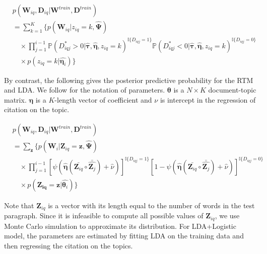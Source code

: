 \begin{equation}
\begin{split}
  &p(\mathbf{W}_{iq}, \mathbf{D}_{iq} \vert \mathbf{W}^{train}, \mathbf{D}^{train}) \\
  &= \sum_{k=1}^K \Big\{ p(\mathbf{W}_{iq} \vert z_{iq} = k, \hat{\boldsymbol \Psi})\\
  &\quad \times \prod_{j=1}^{i-1} \mathbb{P}(D_{iqj}^* > 0 \vert \hat{\boldsymbol \tau}, \hat{\boldsymbol \eta}, z_{iq} = k)^{\mathbb{I}\{D_{iqj}=1\}}\mathbb{P}(D_{iqj}^* < 0 \vert \hat{\boldsymbol \tau}, \hat{\boldsymbol \eta}, z_{iq} = k)^{\mathbb{I}\{D_{iqj}=0\}} \\
  &\quad \times p(z_{iq} = k \vert \hat{\boldsymbol \eta_i}) \Big\}
\end{split}
\end{equation}

By contrast, the following gives the posterior predictive probability for the RTM and LDA. 
We follow \cite{chang2009relational} for the notation of parameters.
$\boldsymbol\theta$ is a $N \times K$ document-topic matrix.
$\boldsymbol\eta$ is a $K$-length vector of coefficient and $\nu$ is intercept in the regression of citation on the topic.

\begin{equation}
\begin{split}
  &p(\mathbf{W}_{iq}, \mathbf{D}_{iq} \vert \mathbf{W}^{train}, \mathbf{D}^{train}) \\
  &= \sum_{\mathbf{z}} \Big\{ p(\mathbf{W}_{i} \vert \mathbf{Z}_{iq} = \mathbf{z}, \hat{\boldsymbol \Psi})\\
  &\quad \times \prod_{j=1}^{i-1}
  \left[\psi\left(\hat{\boldsymbol\eta}(\bar{\mathbf{Z}_{iq}} \circ \bar{\hat{\mathbf{Z}_j}}) + \hat{\nu}\right)\right]^{\mathbb{I}\{D_{iqj} = 1\}}
  \left[1-\psi\left(\hat{\boldsymbol\eta}(\bar{\mathbf{Z}_{iq}} \circ \bar{\hat{\mathbf{Z}_j}}) + \hat{\nu}\right)\right]^{\mathbb{I}\{D_{iqj} = 0\}} \\
  &\quad \times p(\mathbf{Z_{iq}} = \mathbf{z} \vert \hat{\boldsymbol \theta_i}) \Big\}
\end{split}
\end{equation}

Note that $\mathbf{Z}_{iq}$ is a vector with its length equal to the number of words in the test paragraph.
Since it is infeasible to compute all possible values of $\mathbf{Z}_{iq}$, we use Monte Carlo simulation to approximate its distribution. 
For LDA+Logistic model, the parameters are estimated by fitting LDA on the training data and then regressing the citation on the topics.

